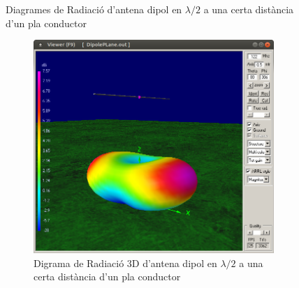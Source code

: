 \begin{figure}[H]
\begin{subfigure}[b]{0.32\textwidth}
	  \caption{}
	  \label{2diag2}
	  \end{subfigure}
	  \vspace{10pt}
	\caption{Diagrames de Radiació d'antena dipol en $\lambda/2$ a una certa distància d'un pla conductor}
	\label{diag3}
	\end{figure}

	\begin{figure}[H]
	\centering
	  \begin{subfigure}[b]{0.53\textwidth}
	  \includegraphics[width=\textwidth]{./images/2.Dypole_overPlane/2_3d.png}
	  \caption{Digrama de Radiació 3D d'antena dipol en $\lambda/2$ a una certa distància d'un pla conductor}
	  \label{2diag3d}
	  \end{subfigure}
	  \qquad %
	  \begin{subfigure}[b]{0.33\textwidth}

\end{subfigure}
\end{figure}
